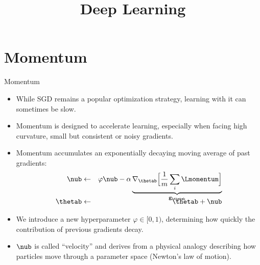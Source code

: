 




\newcommand{\titlefigure}{figure/momentum.png}
\newcommand{\learninggoals}{
  \item SGD with Momentum
  \item Learning Rate Schedules
  \item Adaptive Learning Rates
  \item Batch Normalization
}

\title{Deep Learning}
\date{}




\section{Momentum}
\begin{vbframe}{Momentum}
  \begin{itemize}
    \item While SGD remains a popular optimization strategy, learning with it can sometimes be slow. 
    \item Momentum is designed to accelerate learning, especially when facing high curvature, small but consistent or noisy gradients.
    \item Momentum accumulates an exponentially decaying moving average of past gradients:
      \begin{eqnarray*} 
        \nub &\leftarrow& \varphi \nub - \alpha \underbrace{\nabla_{\thetab} \Big[\frac{1}{m} \sum_{i} \Lmomentum \Big]}_{\mathbf{g}_{\thetab}}\\[-0.3cm]
        \thetab &\leftarrow& \thetab + \nub
      \end{eqnarray*}
    \item We introduce a new hyperparameter $\varphi \in [0, 1)$, determining how quickly the contribution of previous gradients decay.
    \item $\nub$ is called \enquote{velocity} and derives from a physical analogy describing how particles move through a parameter space (Newton's law of motion).
  \end{itemize}
\end{vbframe}

